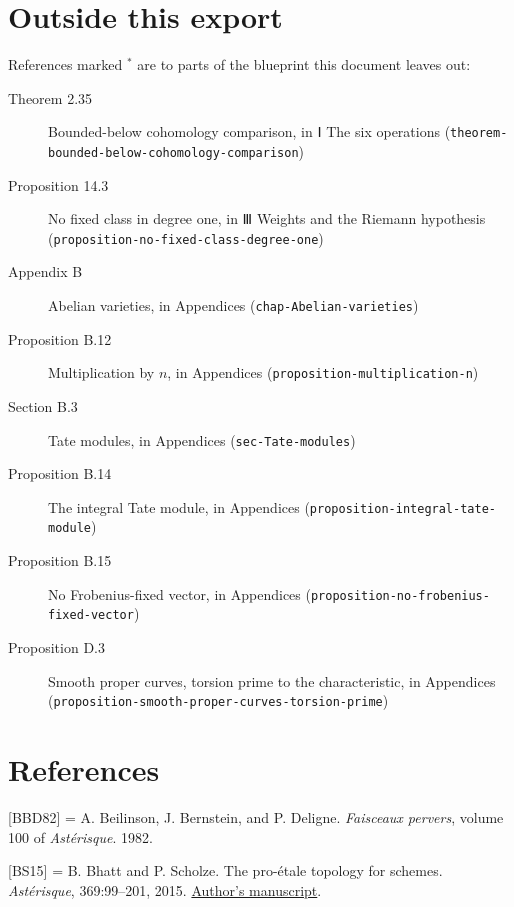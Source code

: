 \documentclass[11pt]{article}
\newcommand{\bpslug}[1]{\texttt{#1}}
\newcommand{\bpbibitem}[3]{\par\setbox0\hbox{[#1]\enspace}\ifdim\wd0<5em\setbox0\hbox to 5em{[#1]\hfil}\fi
  \hangindent=\wd0 \hangafter=1 \noindent\box0\phantomsection\label{#2}#3\par\smallskip}
\begin{document}
\clearpage{}\hypertarget{bp-outside}{}%
\section*{Outside this export}
References marked \ensuremath{{}^\ast} are to parts of the blueprint this document leaves out:
\begin{description}
\item[Theorem 2.35] Bounded-below cohomology comparison, in Ⅰ The six operations (\bpslug{theorem-{}\allowbreak{}bounded-{}\allowbreak{}below-{}\allowbreak{}cohomology-{}\allowbreak{}comparison})
\item[Proposition 14.3] No fixed class in degree one, in Ⅲ Weights and the Riemann hypothesis (\bpslug{proposition-{}\allowbreak{}no-{}\allowbreak{}fixed-{}\allowbreak{}class-{}\allowbreak{}degree-{}\allowbreak{}one})
\item[Appendix B] Abelian varieties, in Appendices (\bpslug{chap-{}\allowbreak{}Abelian-{}\allowbreak{}varieties})
\item[Proposition B.12] Multiplication by $n$, in Appendices (\bpslug{proposition-{}\allowbreak{}multiplication-{}\allowbreak{}n})
\item[Section B.3] Tate modules, in Appendices (\bpslug{sec-{}\allowbreak{}Tate-{}\allowbreak{}modules})
\item[Proposition B.14] The integral Tate module, in Appendices (\bpslug{proposition-{}\allowbreak{}integral-{}\allowbreak{}tate-{}\allowbreak{}module})
\item[Proposition B.15] No Frobenius-fixed vector, in Appendices (\bpslug{proposition-{}\allowbreak{}no-{}\allowbreak{}frobenius-{}\allowbreak{}fixed-{}\allowbreak{}vector})
\item[Proposition D.3] Smooth proper curves, torsion prime to the characteristic, in Appendices (\bpslug{proposition-{}\allowbreak{}smooth-{}\allowbreak{}proper-{}\allowbreak{}curves-{}\allowbreak{}torsion-{}\allowbreak{}prime})
\end{description}
\clearpage{}%
\section*{References}
\bpbibitem{BBD82}{bp55}{A. Beilinson, J. Bernstein, and P. Deligne. \emph{Faisceaux pervers}, volume 100 of \emph{Astérisque}. 1982.}

\bpbibitem{BS15}{bp56}{B. Bhatt and P. Scholze. The pro-étale topology for schemes. \emph{Astérisque}, 369:99–201, 2015. \href{https://people.mpim-bonn.mpg.de/scholze/proetale.pdf}{Author's manuscript}.}
\end{document}

